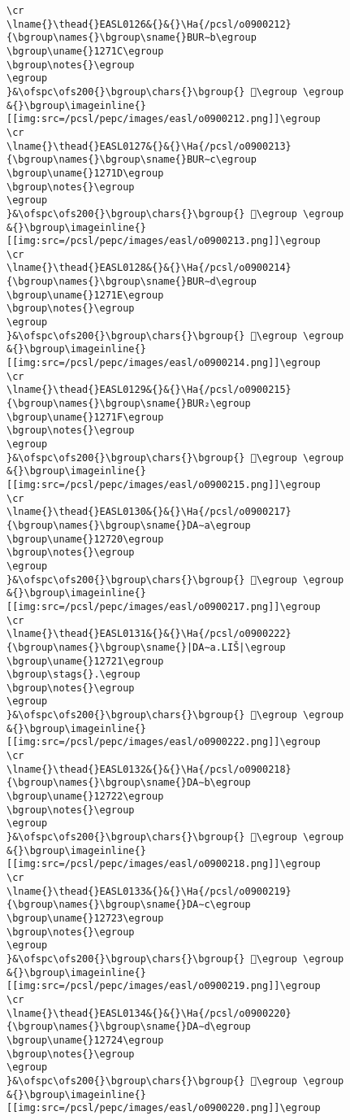 \begin{verbatim}
\cr
\lname{}\thead{}EASL0126&{}&{}\Ha{/pcsl/o0900212}{\bgroup\names{}\bgroup\sname{}BUR∼b\egroup
\bgroup\uname{}1271C\egroup
\bgroup\notes{}\egroup
\egroup
}&\ofspc\ofs200{}\bgroup\chars{}\bgroup{} 𒜜\egroup \egroup
&{}\bgroup\imageinline{}[[img:src=/pcsl/pepc/images/easl/o0900212.png]]\egroup
\cr
\lname{}\thead{}EASL0127&{}&{}\Ha{/pcsl/o0900213}{\bgroup\names{}\bgroup\sname{}BUR∼c\egroup
\bgroup\uname{}1271D\egroup
\bgroup\notes{}\egroup
\egroup
}&\ofspc\ofs200{}\bgroup\chars{}\bgroup{} 𒜝\egroup \egroup
&{}\bgroup\imageinline{}[[img:src=/pcsl/pepc/images/easl/o0900213.png]]\egroup
\cr
\lname{}\thead{}EASL0128&{}&{}\Ha{/pcsl/o0900214}{\bgroup\names{}\bgroup\sname{}BUR∼d\egroup
\bgroup\uname{}1271E\egroup
\bgroup\notes{}\egroup
\egroup
}&\ofspc\ofs200{}\bgroup\chars{}\bgroup{} 𒜞\egroup \egroup
&{}\bgroup\imageinline{}[[img:src=/pcsl/pepc/images/easl/o0900214.png]]\egroup
\cr
\lname{}\thead{}EASL0129&{}&{}\Ha{/pcsl/o0900215}{\bgroup\names{}\bgroup\sname{}BUR₂\egroup
\bgroup\uname{}1271F\egroup
\bgroup\notes{}\egroup
\egroup
}&\ofspc\ofs200{}\bgroup\chars{}\bgroup{} 𒜟\egroup \egroup
&{}\bgroup\imageinline{}[[img:src=/pcsl/pepc/images/easl/o0900215.png]]\egroup
\cr
\lname{}\thead{}EASL0130&{}&{}\Ha{/pcsl/o0900217}{\bgroup\names{}\bgroup\sname{}DA∼a\egroup
\bgroup\uname{}12720\egroup
\bgroup\notes{}\egroup
\egroup
}&\ofspc\ofs200{}\bgroup\chars{}\bgroup{} 𒜠\egroup \egroup
&{}\bgroup\imageinline{}[[img:src=/pcsl/pepc/images/easl/o0900217.png]]\egroup
\cr
\lname{}\thead{}EASL0131&{}&{}\Ha{/pcsl/o0900222}{\bgroup\names{}\bgroup\sname{}|DA∼a.LIŠ|\egroup
\bgroup\uname{}12721\egroup
\bgroup\stags{}.\egroup
\bgroup\notes{}\egroup
\egroup
}&\ofspc\ofs200{}\bgroup\chars{}\bgroup{} 𒜡\egroup \egroup
&{}\bgroup\imageinline{}[[img:src=/pcsl/pepc/images/easl/o0900222.png]]\egroup
\cr
\lname{}\thead{}EASL0132&{}&{}\Ha{/pcsl/o0900218}{\bgroup\names{}\bgroup\sname{}DA∼b\egroup
\bgroup\uname{}12722\egroup
\bgroup\notes{}\egroup
\egroup
}&\ofspc\ofs200{}\bgroup\chars{}\bgroup{} 𒜢\egroup \egroup
&{}\bgroup\imageinline{}[[img:src=/pcsl/pepc/images/easl/o0900218.png]]\egroup
\cr
\lname{}\thead{}EASL0133&{}&{}\Ha{/pcsl/o0900219}{\bgroup\names{}\bgroup\sname{}DA∼c\egroup
\bgroup\uname{}12723\egroup
\bgroup\notes{}\egroup
\egroup
}&\ofspc\ofs200{}\bgroup\chars{}\bgroup{} 𒜣\egroup \egroup
&{}\bgroup\imageinline{}[[img:src=/pcsl/pepc/images/easl/o0900219.png]]\egroup
\cr
\lname{}\thead{}EASL0134&{}&{}\Ha{/pcsl/o0900220}{\bgroup\names{}\bgroup\sname{}DA∼d\egroup
\bgroup\uname{}12724\egroup
\bgroup\notes{}\egroup
\egroup
}&\ofspc\ofs200{}\bgroup\chars{}\bgroup{} 𒜤\egroup \egroup
&{}\bgroup\imageinline{}[[img:src=/pcsl/pepc/images/easl/o0900220.png]]\egroup

\end{verbatim}
